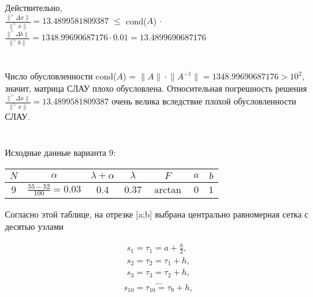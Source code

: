 \documentclass[a4paper, 12pt]{extarticle}
\begin{document}
\begin{spacing}{1.5}
Действительно, \\
$\frac{\lVert ^> \Delta x \rVert}{\lVert ^>x \rVert} = 13.4899581809387$ $\leq$ cond($A$) $\cdot$  $\frac{\lVert ^> \Delta b \rVert}{\lVert ^>b \rVert} = 1348.99690687176 \cdot 0.01 = 13.4899690687176$
\end{spacing}

\section*{}

\begin{spacing}{1.5}
Число обусловленности cond($A$) = $\lVert A \rVert \cdot \lVert A^{-1} \rVert = 1348.99690687176 > 10^2$, значит, матрица СЛАУ плохо обусловлена. 
Относительная погрешность решения $\frac{\lVert ^> \Delta x \rVert}{\lVert ^>x \rVert} = 13.4899581809387$ очень велика вследствие плохой обусловленности СЛАУ.
\end{spacing}

\section*{}

Исходные данные варианта 9: \\


\renewcommand{\arraystretch}{2} %

\begin{table}[h]
    \centering
    \begin{tabular}{|c|c|c|c|c|c|c|}
        \hline
        $N$ & $\alpha$ & $\lambda + \alpha$ & $\lambda$ & $F$ & $a$ & $b$ \\
        \hline
        $9$ & $\frac{55 - 52}{100} = 0.03$ & $0.4$ & $0.37$ & $\arctan$ & $0$ & $1$ \\
        \hline
    \end{tabular}
\end{table}

Согласно этой таблице, на отрезке [a;b] выбрана центрально равномерная сетка с десятью узлами

\begin{align*}
    s_1 = \tau_1 = a + \frac{h}{2}, \\ 
    s_2 = \tau_2 = \tau_1 + h, \\
    s_3 = \tau_3 = \tau_2 + h, \\ 
\end{align*}
\vspace{-3\baselineskip}
\begin{equation*}
    \dots
\end{equation*}
\vspace{-1\baselineskip}
\begin{equation*}
    s_{10} = \tau_{10} = \tau_9 + h, 
\end{equation*}
\end{document}
